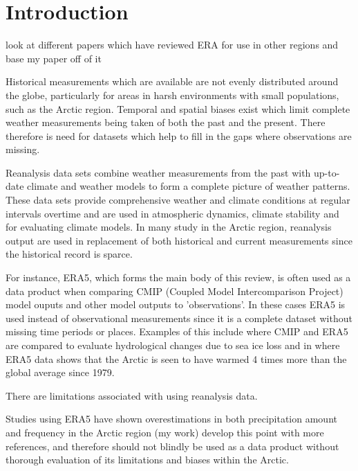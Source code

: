 \documentclass[12pt, oneside]{article}
\begin{document}
\thispagestyle{empty}
\clearpage
\setcounter{page}{1}


\pagebreak



\section{Introduction}

{\color{blue}look at different papers which have reviewed ERA for use in other regions and base my paper off of it}


Historical measurements which are available are not evenly distributed around the globe, particularly for areas in harsh environments with small populations, such as the Arctic region. Temporal and spatial biases exist which limit complete weather measurements being taken of both the past and the present. There therefore is need for datasets which help to fill in the gaps where observations are missing.

Reanalysis data sets combine weather measurements from the past with up-to-date climate and weather models to form a complete picture of weather patterns. These data sets provide comprehensive weather and climate conditions at regular intervals overtime and are used in atmospheric dynamics, climate stability and for evaluating climate models. In many study in the Arctic region, reanalysis output are used in replacement of both historical and current measurements since the historical record is sparce.

For instance, ERA5, which forms the main body of this review, is often used as a data product when comparing CMIP (Coupled Model Intercomparison Project) model ouputs and other model outputs to 'observations'. In these cases ERA5 is used instead of observational measurements since it is a complete dataset without missing time periods or places. Examples of this include \cite{ford2022arctic} where CMIP and ERA5 are compared to evaluate hydrological changes due to sea ice loss and in \cite{rantanen2022arctic} where ERA5 data shows that the Arctic is seen to have warmed 4 times more than the global average since 1979. 

There are limitations associated with using reanalysis data. 


Studies using ERA5 have shown overestimations in both precipitation amount and frequency in the Arctic region (my work) 
 develop this point with more references, 
 and therefore should not blindly be used as a data product without thorough evaluation of its limitations and biases within the Arctic. 
\end{document}
